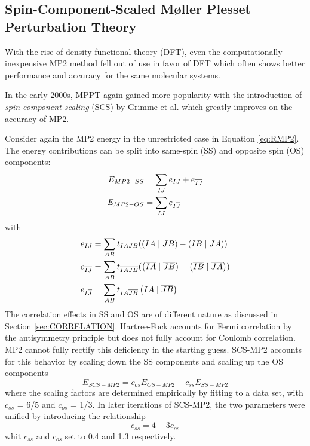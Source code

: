 \subsection{Spin-Component-Scaled M{\o}ller Plesset Perturbation Theory \label{sec:SCSMP2}}

With the rise of density functional theory (DFT), even the computationally inexpensive MP2 method fell out of use in favor of DFT which often shows better performance and accuracy for the same molecular systems.

In the early 2000s, MPPT again gained more popularity with the introduction of \emph{spin-component scaling} (SCS) by Grimme et al. \cite{Gri2003,Gri2012} which greatly improves on the accuracy of MP2.

Consider again the MP2 energy in the unrestricted case in Equation \ref{eq:RMP2}. The energy contributions can be split into same-spin (SS) and opposite spin (OS) components:
\begin{align}
E_{MP2-SS} &= \sum_{IJ} e_{IJ} + e_{\overline{I}\overline{J}} \\
E_{MP2-OS} &= \sum_{IJ} e_{I\overline{J}} 
\end{align}
\noindent with
\begin{align}
e_{IJ} &= \sum_{AB} t_{IAJB} (\left( IA \mid JB \right) - \left( IB \mid JA \right)) \\
e_{\overline{I}\overline{J}} &= \sum_{AB} t_{\overline{I}\overline{A}\overline{J}\overline{B}} (\left( \overline{I}\overline{A} \mid \overline{J}\overline{B} \right) - \left( \overline{I}\overline{B} \mid \overline{J}\overline{A} \right)) \\
e_{I\overline{J}} &= \sum_{AB} t_{IA\overline{J}\overline{B}} \left( IA \mid \overline{J}\overline{B} \right)  
\end{align}
The correlation effects in SS and OS are of different nature as discussed in Section \ref{sec:CORRELATION}. Hartree-Fock accounts for Fermi correlation by the antisymmetry principle but does not fully account for Coulomb correlation. MP2 cannot fully rectify this deficiency in the starting guess. SCS-MP2 accounts for this behavior by scaling down the SS components and scaling up the OS components
\begin{equation}
E_{SCS-MP2} = c_{os} E_{OS-MP2} + c_{ss} E_{SS-MP2}
\end{equation}
\noindent where the scaling factors are determined empirically by fitting to a data set, with $c_{ss}$ = 6/5 and $c_{os}$ = 1/3. In later iterations of SCS-MP2, the two parameters were unified by introducing the relationship
\begin{equation}
c_{ss} = 4 - 3c_{os}
\end{equation}
\noindent whit $c_{ss}$ and $c_{os}$ set to 0.4 and 1.3 respectively.


